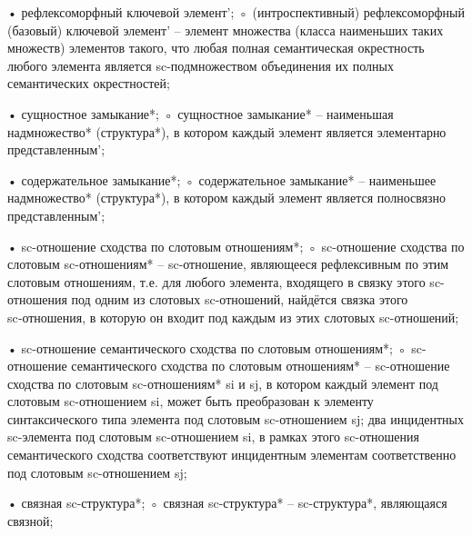 \begin{SCn}
\end{SCn}
• рефлексоморфный ключевой элемент’;
◦ (интроспективный) рефлексоморфный (базовый) ключевой элемент’ – элемент множества (класса наименьших таких множеств) элементов такого, что любая полная семантическая окрестность любого элемента является sc-подмножеством объединения их полных семантических окрестностей;

\begin{SCn}
\end{SCn}
• сущностное замыкание*;
◦ сущностное замыкание* – наименьшая надмножество* (структура*), в котором каждый элемент является элементарно представленным’;

\begin{SCn}
\end{SCn}
• содержательное замыкание*;
◦ содержательное замыкание* – наименьшее надмножество* (структура*), в котором каждый элемент является полносвязно представленным’;

\begin{SCn}
\end{SCn}
• sc-отношение сходства по слотовым отношениям*;
◦ sc-отношение сходства по слотовым sc-отношениям* – sc-отношение, являющееся рефлексивным по этим слотовым отношениям, т.е. для любого элемента, входящего в связку этого sc-отношения под одним из слотовых sc-отношений, найдётся связка этого sc‑отношения, в которую он входит под каждым из этих слотовых sc-отношений;

\begin{SCn}
\end{SCn}
• sc-отношение семантического сходства по слотовым отношениям*;
◦ sc-отношение семантического сходства по слотовым отношениям* – sc-отношение сходства по слотовым sc-отношениям* si и sj, в котором каждый элемент под слотовым sc-отношением si, может быть преобразован к элементу синтаксического типа элемента под слотовым sc-отношением sj; два инцидентных sc-элемента под слотовым sc-отношением si, в рамках этого sc-отношения семантического сходства соответствуют инцидентным элементам соответственно под слотовым sc-отношением sj;

\begin{SCn}
\end{SCn}
• связная sc-структура*;
◦ связная sc-структура* – sc-структура*, являющаяся связной;

